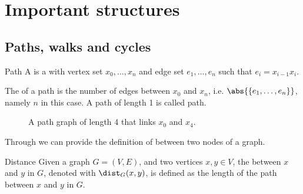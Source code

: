 \documentclass[a4paper, 12pt]{report}
\begin{document}
    \section{Important structures}

    \subsection{Paths, walks and cycles}

    \begin{frameddefn}{Path}
        A  is a  with vertex set $x_0, \ldots, x_n$ and edge set $e_1, \ldots, e_n$ such that $e_i = x_{i - 1}x_i$.

        The  of a path is the number of edges between $x_0$ and $x_n$, i.e. $\abs{\{e_1, \ldots, e_n\}}$, namely $n$ in this case. A path of length 1 is called  path.
    \end{frameddefn}

    \begin{figure}[H]
        \centering
        \caption{A path graph of length 4 that links $x_0$ and $x_4$.}
    \end{figure}

    Through  we can provide the definition of  between two nodes of a graph.

    \begin{frameddefn}{Distance}
        Given a graph $G = (V, E)$, and two vertices $x, y \in V$, the  between $x$ and $y$ in $G$, denoted with $\dist_G(x, y)$, is defined as the length of the  path between $x$ and $y$ in $G$.
    \end{frameddefn}
\end{document}
